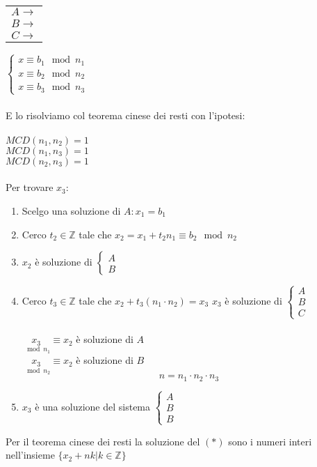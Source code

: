 \begin{tabular}{c}
    $A\longrightarrow$\\
    $B\longrightarrow$\\
    $C\longrightarrow$
\end{tabular}
$
\begin{cases}
    x\equiv b_1\mod n_1\\
    x\equiv b_2\mod n_2\\
    x\equiv b_3\mod n_3
\end{cases}
$\\\\
E lo risolviamo col teorema cinese dei resti con l'ipotesi:\\\\
$MCD(n_1,n_2)=1$\\
$MCD(n_1,n_3)=1$\\
$MCD(n_2,n_3)=1$\\\\
Per trovare $x_3$:
\begin{enumerate}
    \item Scelgo una soluzione di $A: x_1=b_1$
    \item Cerco $t_2\in\mathbb{Z}$ tale che $x_2=x_1+t_2n_1
        \equiv b_2\mod n_2$
    \item $x_2$ è soluzione di $\begin{cases}A\\B\end{cases}$
    \item Cerco $t_3\in\mathbb{Z}$ tale che $x_2+t_3(n_1\cdot n_2)=x_3$
        $x_3$ è soluzione di 
        $
        \begin{cases}
            A\\B\\C
        \end{cases}
        $\\\\
        $\underset{\mod n_1}{x_3}\equiv x_2$ è soluzione di $A$\\
        $\underset{\mod n_2}{x_3}\equiv x_2$ è soluzione di $B$
        $$n=n_1\cdot n_2\cdot n_3$$
    \item $x_3$ è una soluzione del sistema $\begin{cases}A\\B\\B\end{cases}$
\end{enumerate}
Per il teorema cinese dei resti la soluzione del $(*)$ sono i numeri interi nell'insieme $\{x_2+nk|k\in\mathbb{Z}\}$

